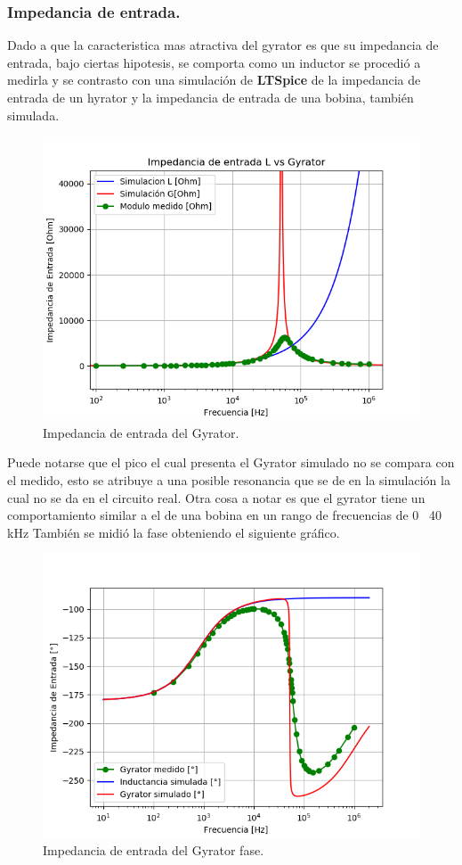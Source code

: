\documentclass[a4paper]{article}
\begin{document}
\subsubsection{Impedancia de entrada.}

Dado a que la caracteristica mas atractiva del gyrator es que su impedancia de entrada, bajo ciertas hipotesis, se comporta como un inductor se procedió a medirla y se contrasto con una simulación de \textbf{LTSpice} de la impedancia de entrada de un hyrator y la impedancia de entrada de una bobina, también simulada.

\begin{figure}[H]	
	\centering
	\includegraphics[width=\textwidth]{ImagenesEj2/ZinG.png}
	\caption{Impedancia de entrada del Gyrator.}
	\label{fig:ZinG}
\end{figure}
Puede notarse que el pico el cual presenta el Gyrator simulado no se compara con el medido, esto se atribuye a una posible resonancia que se de en la simulación la cual no se da en el circuito real. Otra cosa a notar es que el gyrator tiene un comportamiento similar a el de una bobina en un rango de frecuencias de 0 ~40 kHz
También se midió la fase obteniendo el siguiente gráfico.
\begin{figure}[H]	
	\centering
	\includegraphics[width=\textwidth]{ImagenesEj2/ZinGp.png}
	\caption{Impedancia de entrada del Gyrator fase.}
	\label{fig:ZinG}
\end{figure}
\end{document}
